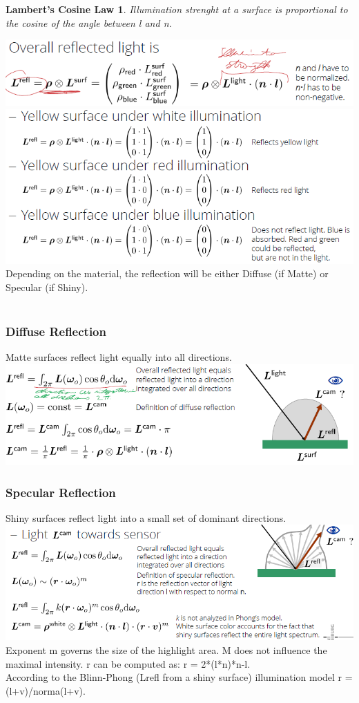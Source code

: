 \documentclass{article}
\newtheorem{theorem}{Lambert's Cosine Law}
\begin{document}
\begin{theorem}
Illumination strenght at a surface is proportional to the cosine of the angle between l and n.
\end{theorem}
\includegraphics[scale=0.6]{image14.png}\\
\includegraphics[scale=0.6]{image15.png}\\
Depending on the material, the reflection will be either Diffuse (if Matte) or Specular (if Shiny).\\\\
\subsubsection{Diffuse Reflection}
Matte surfaces reflect light equally into all directions.\\
\includegraphics[scale=0.6]{image16.png}\\
\subsubsection{Specular Reflection}
Shiny surfaces reflect light into a small set of dominant directions.\\
\includegraphics[scale=0.6]{image17.png}\\
Exponent m governs the size of the highlight area. M does not influence the maximal intensity. r can be computed as: r = 2*(l*n)*n-l.\\
According to the Blinn-Phong (Lrefl from a shiny surface) illumination model r = (l+v)/norma(l+v).\\
\end{document}
